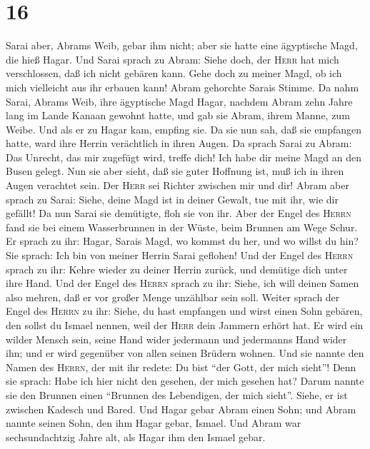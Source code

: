 \hypertarget{section-15}{%
\section{16}\label{section-15}}

 Sarai aber, Abrams Weib, gebar ihm nicht; aber sie hatte
eine ägyptische Magd, die hieß Hagar.  Und Sarai sprach zu
Abram: Siehe doch, der \textsc{Herr} hat mich verschlossen, daß ich
nicht gebären kann. Gehe doch zu meiner Magd, ob ich mich vielleicht aus
ihr erbauen kann! Abram gehorchte Sarais Stimme.  Da nahm
Sarai, Abrams Weib, ihre ägyptische Magd Hagar, nachdem Abram zehn Jahre
lang im Lande Kanaan gewohnt hatte, und gab sie Abram, ihrem Manne, zum
Weibe.  Und als er zu Hagar kam, empfing sie. Da sie nun
sah, daß sie empfangen hatte, ward ihre Herrin verächtlich in ihren
Augen.  Da sprach Sarai zu Abram: Das Unrecht, das mir
zugefügt wird, treffe dich! Ich habe dir meine Magd an den Busen gelegt.
Nun sie aber sieht, daß sie guter Hoffnung ist, muß ich in ihren Augen
verachtet sein. Der \textsc{Herr} sei Richter zwischen mir und dir!
 Abram aber sprach zu Sarai: Siehe, deine Magd ist in
deiner Gewalt, tue mit ihr, wie dir gefällt! Da nun Sarai sie demütigte,
floh sie von ihr.  Aber der Engel des \textsc{Herrn} fand
sie bei einem Wasserbrunnen in der Wüste, beim Brunnen am Wege Schur.
 Er sprach zu ihr: Hagar, Sarais Magd, wo kommst du her,
und wo willst du hin? Sie sprach: Ich bin von meiner Herrin Sarai
geflohen!  Und der Engel des \textsc{Herrn} sprach zu ihr:
Kehre wieder zu deiner Herrin zurück, und demütige dich unter ihre Hand.
 Und der Engel des \textsc{Herrn} sprach zu ihr: Siehe,
ich will deinen Samen also mehren, daß er vor großer Menge unzählbar
sein soll.  Weiter sprach der Engel des \textsc{Herrn} zu
ihr: Siehe, du hast empfangen und wirst einen Sohn gebären, den sollst
du Ismael nennen, weil der \textsc{Herr} dein Jammern erhört hat.
 Er wird ein wilder Mensch sein, seine Hand wider
jedermann und jedermanns Hand wider ihn; und er wird gegenüber von allen
seinen Brüdern wohnen.  Und sie nannte den Namen des
\textsc{Herrn}, der mit ihr redete: Du bist ``der Gott, der mich
sieht''! Denn sie sprach: Habe ich hier nicht den gesehen, der mich
gesehen hat?  Darum nannte sie den Brunnen einen
``Brunnen des Lebendigen, der mich sieht''. Siehe, er ist zwischen
Kadesch und Bared.  Und Hagar gebar Abram einen Sohn; und
Abram nannte seinen Sohn, den ihm Hagar gebar, Ismael. 
Und Abram war sechsundachtzig Jahre alt, als Hagar ihm den Ismael gebar.

